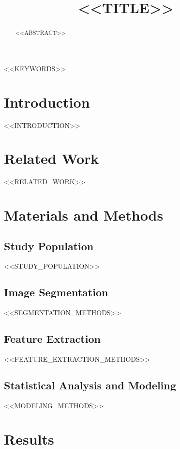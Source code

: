 \documentclass[conference]{IEEEtran}
\begin{document}
\title{<<TITLE>>}

\author{
}

\maketitle

\begin{abstract}
<<ABSTRACT>>
\end{abstract}

\begin{IEEEkeywords}
<<KEYWORDS>>
\end{IEEEkeywords}

\section{Introduction}
<<INTRODUCTION>>

\section{Related Work}
<<RELATED_WORK>>

\section{Materials and Methods}

\subsection{Study Population}
<<STUDY_POPULATION>>

\subsection{Image Segmentation}
<<SEGMENTATION_METHODS>>

\subsection{Feature Extraction}
<<FEATURE_EXTRACTION_METHODS>>

\subsection{Statistical Analysis and Modeling}
<<MODELING_METHODS>>

\section{Results}
\end{document}
